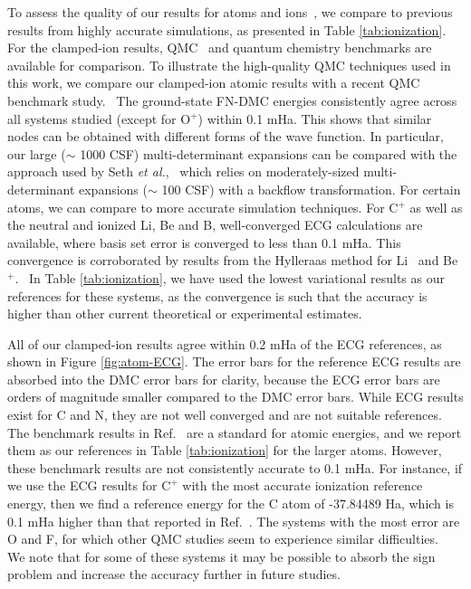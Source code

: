 To assess the quality of our results for atoms and ions~\cite{masses}, we compare to previous results from highly accurate simulations, as presented in Table \ref{tab:ionization}. For the clamped-ion results, QMC~\cite{Brown_Bench,Toulouse_Bench,Seth_Bench,Morale_Bench,Rappe_Bench} and quantum chemistry benchmarks are available for comparison. To illustrate the high-quality QMC techniques used in this work, we compare our clamped-ion atomic results with a recent QMC benchmark study.~\cite{Seth_Bench} The ground-state FN-DMC energies consistently agree across all systems studied (except for O$^{+}$) within 0.1 mHa. This shows that similar nodes can be obtained with different forms of the wave function. In particular, our large ($\sim$ 1000 CSF) multi-determinant expansions can be compared with the approach used by Seth {\it et al.},~\cite{Seth_Bench} which relies on moderately-sized multi-determinant expansions ($\sim$ 100 CSF) with a backflow transformation. For certain atoms, we can compare to more accurate simulation techniques. For C$^+$ as well as the neutral and ionized Li, Be and B, well-converged ECG calculations are available, where basis set error is converged to less than 0.1 mHa. This convergence is corroborated by results from the Hylleraas method for Li~\cite{Wang_Li} and Be$^+$.~\cite{Puchalski_Be+} In Table \ref{tab:ionization}, we have used the lowest variational results as our references for these systems, as the convergence is such that the accuracy is higher than other current theoretical or experimental estimates. 

All of our clamped-ion results agree within 0.2 mHa of the ECG references, as shown in Figure \ref{fig:atom-ECG}. The error bars for the reference ECG results are absorbed into the DMC error bars for clarity, because the ECG error bars are orders of magnitude smaller compared to the DMC error bars. While ECG results exist for C and N, they are not well converged and are not suitable references.~\cite{Bubin_C,Sharkey_N} The benchmark results in Ref.~\cite{Davidson_Atoms} are a standard for atomic energies, and we report them as our references in Table \ref{tab:ionization} for the larger atoms. However, these benchmark results are not consistently accurate to 0.1 mHa. For instance, if we use the ECG results for $\text{C}^+$ with the most accurate ionization reference energy, then we find a reference energy for the C atom of -37.84489 Ha, which is 0.1 mHa higher than that reported in Ref.~\cite{Davidson_Atoms}. %
The systems with the most error are O and F, for which other QMC studies seem to experience similar difficulties.~\cite{Seth_Bench,Booth_FCIQMC,Brown_Bench,Shiwei_AFQMC} We note that for some of these systems it may be possible to absorb the sign problem and increase the accuracy further in future studies.~\cite{Tubman_Release,Tubman_ACS} %

